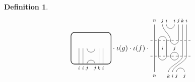 \documentclass[11pt]{article}
\theoremstyle{plain}
\theoremstyle{definition}
\newtheorem{defn}[thm]{Definition}
\begin{document}
\begin{defn}
\begin{align*}
\begin{tikzpicture}[baseline=.3cm]
\begin{scope}[shift={(0,-.4)}]
    \draw (.4,0) -- (.4,.8);
    \node at (.4,-.2) {\scriptsize{$i$}};
    \draw (.6,0) -- (.6,.8);
    \node at (.6,-.2) {\scriptsize{$i$}};
    \draw (.8,.8) arc (-180:0:.2cm); %
    \draw (.8,0) arc (180:0:.2cm);
    \node at (.8,-.2) {\scriptsize{$j$}};
    \node at (1.2,-.2) {\scriptsize{$j$}};
    \draw (1.4,0) -- (1.4,.8);
    \node at (1.4,-.2) {\scriptsize{$k$}};
    \draw (1.6,0) -- (1.6,.8);
    \node at (1.6,-.2) {\scriptsize{$i$}};
   \end{scope}
   \draw[thick, rounded corners = 5pt] (0,-.4) rectangle (2,1.2);
  \end{tikzpicture}
  \cdot\iota(g)\cdot\iota(f)\cdot
  \begin{tikzpicture}[baseline=.3cm]
   \begin{scope}[shift={(0,.8)}]
    \draw (.2,0) -- (.2,.8);
    \node at (.2,1) {\scriptsize{$n$}};
    \draw (.6,.8) .. controls ++(-90:.3cm) and ++ (-270:.3cm) .. (1,0);
    \node at (.6,1) {\scriptsize{$j$}};
    \draw (.8,.8) arc (-180:0:.2cm);
    \node at (.8,1) {\scriptsize{$i$}};
    \node at (1.2,1) {\scriptsize{$i$}};
    \draw (.4,0) arc (180:0:.2cm); %
    \draw (1.4,0) -- (1.4,.8);
    \node at (1.4,1) {\scriptsize{$j$}};
    \draw (1.6,0) -- (1.6,.8);
    \node at (1.6,1) {\scriptsize{$k$}};
    \draw (1.8,0) -- (1.8,.8);
    \node at (1.8,1) {\scriptsize{$i$}};
    \draw[dashed] (0,0) -- (2,0);
   \end{scope}
   \begin{scope}[shift={(0,0)}]
    \draw (.2,0) -- (.2,.8); %
    \draw (.4,0) -- (.4,.8); %
    \draw (.8,0) -- (.8,.8); %
    \node at (.6,.4) {\scriptsize{$i$}}; %
    \draw (1,.8) arc (-180:0:.2cm); %
    \draw (1,0) arc(180:0:.2cm);
    \node at (1.2,.4) {\scriptsize{$j$}}; %
    \draw (1.6,0) -- (1.6,.8); %
    \draw (1.8,0) -- (1.8,.8); %
    \draw[dashed] (0,0) -- (2,0);
   \end{scope}
   \begin{scope}[shift={(0,-.8)}]
    \draw (.2,0) -- (.2,.8);
    \node at (.2,-.2) {\scriptsize{$n$}};
    \draw (.4,.8) arc (-180:0:.2cm); %
    \draw (1,.8) arc (-180:0:.2cm); %
    \draw (1.6,.8) .. controls ++(-90:.3cm) and ++(-270:.3cm) .. (.9,0);
    \node at (.9,-.2) {\scriptsize{$k$}};
    \draw (1.8,.8) .. controls ++(-90:.3cm) and ++(-270:.3cm) .. (1.1,0);
    \node at (1.1,-.2) {\scriptsize{$i$}};
    \draw (1.3,0) arc (180:0:.2cm);
    \node at (1.3,-.2) {\scriptsize{$j$}};
    \node at (1.7,-.2) {\scriptsize{$j$}};
   \end{scope}

\end{tikzpicture}
\end{align*}
\end{defn}
\end{document}
